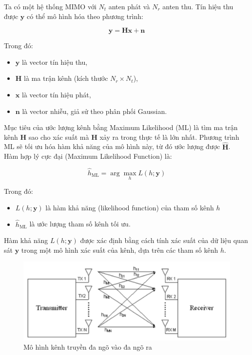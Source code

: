 \documentclass{article}
\begin{document}
Ta có một hệ thống MIMO với \( N_t \) anten phát và \( N_r \) anten thu. Tín hiệu thu được \( \mathbf{y} \) có thể mô hình hóa theo phương trình:

\[
\mathbf{y} = \mathbf{H} \mathbf{x} + \mathbf{n}
\]

Trong đó:
\begin{itemize}
  \item \( \mathbf{y} \) là vector tín hiệu thu,
  \item \( \mathbf{H} \) là ma trận kênh (kích thước \( N_r \times N_t \)),
  \item \( \mathbf{x} \) là vector tín hiệu phát,
  \item \( \mathbf{n} \) là vector nhiễu, giả sử theo phân phối Gaussian.
\end{itemize}

Mục tiêu của ước lượng kênh bằng Maximum Likelihood (ML) là tìm ma trận kênh \( \mathbf{H} \) sao cho xác suất mà \( \mathbf{H} \) xảy ra trong thực tế là lớn nhất. Phương trình ML sẽ tối ưu hóa hàm khả năng của mô hình này, từ đó ước lượng được \( \mathbf{\hat{H}} \).\\

Hàm hợp lý cực đại (Maximum Likelihood Function) là:

\[
\hat{h}_{\text{ML}} = \arg \max_h L(h; \mathbf{y})
\]

Trong đó:
\begin{itemize}
  \item \( L(h; \mathbf{y}) \) là hàm khả năng (likelihood function) của tham số kênh \( h \) 
  \item \( \hat{h}_{\text{ML}} \) là ước lượng tham số kênh tối ưu.
\end{itemize}

Hàm khả năng \( L(h; \mathbf{y}) \) được xác định bằng cách tính xác suất của dữ liệu quan sát \( \mathbf{y} \) trong một mô hình xác suất của kênh, dựa trên các tham số kênh \( h \).
\begin{figure}[h!]
    \centering
   \includegraphics[width=14cm]{photo/2.1.png}
    \caption{Mô hình kênh truyền đa ngõ vào đa ngõ ra}
    \label{Hình 1}
\end{figure}
\end{document}
